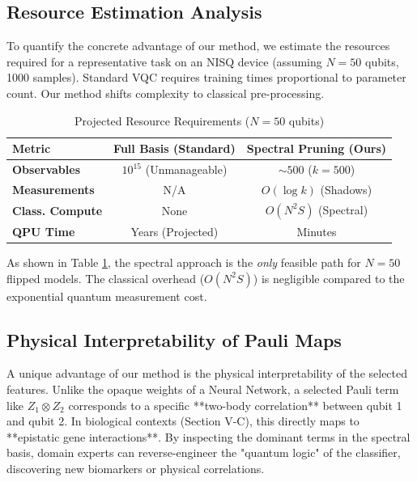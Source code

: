 \documentclass[conference]{IEEEtran}
\begin{document}
\subsection{Resource Estimation Analysis}
To quantify the concrete advantage of our method, we estimate the resources required for a representative task on an NISQ device (assuming $N=50$ qubits, 1000 samples). Standard VQC requires training times proportional to parameter count. Our method shifts complexity to classical pre-processing.

\begin{table}[h]
    \centering
    \caption{Projected Resource Requirements ($N=50$ qubits)}
    \begin{tabular}{lcc}
        \hline
        Metric & Full Basis (Standard) & Spectral Pruning (Ours) \\
        \hline
        \textbf{Observables} & $10^{15}$ (Unmanageable) & $\sim 500$ ($k=500$) \\
        \textbf{Measurements} & N/A & $O(\log k)$ (Shadows) \\
        \textbf{Class. Compute} & None & $O(N^2 S)$ (Spectral) \\
        \textbf{QPU Time} & Years (Projected) & Minutes \\
        \hline
    \end{tabular}
    \label{tab:resources}
\end{table}
As shown in Table \ref{tab:resources}, the spectral approach is the \textit{only} feasible path for $N=50$ flipped models. The classical overhead ($O(N^2 S)$) is negligible compared to the exponential quantum measurement cost.

\subsection{Physical Interpretability of Pauli Maps}
A unique advantage of our method is the physical interpretability of the selected features. Unlike the opaque weights of a Neural Network, a selected Pauli term like $Z_1 \otimes Z_2$ corresponds to a specific **two-body correlation** between qubit 1 and qubit 2. In biological contexts (Section V-C), this directly maps to **epistatic gene interactions**. By inspecting the dominant terms in the spectral basis, domain experts can reverse-engineer the "quantum logic" of the classifier, discovering new biomarkers or physical correlations.
\end{document}
